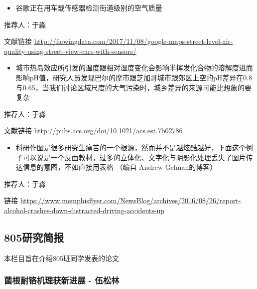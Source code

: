 \documentclass[]{book}
\providecommand{\tightlist}{%
  \setlength{\itemsep}{0pt}\setlength{\parskip}{0pt}}
\begin{document}
\begin{itemize}
\tightlist
\item
  谷歌正在用车载传感器检测街道级别的空气质量
\end{itemize}

推荐人：于淼

文献链接 \url{http://flowingdata.com/2017/11/08/google-maps-street-level-air-quality-using-street-view-cars-with-sensors/}

\begin{itemize}
\tightlist
\item
  城市热岛效应所引发的温度跟相对湿度变化会影响半挥发化合物的溶解度进而影响pH值，研究人员发现巴尔的摩市跟芝加哥城市跟郊区上空的pH差异在0.8与0.65，当我们讨论区域尺度的大气污染时，城乡差异的来源可能比想象的要复杂
\end{itemize}

推荐人：于淼

文献链接 \url{http://pubs.acs.org/doi/10.1021/acs.est.7b02786}

\begin{itemize}
\tightlist
\item
  科研作图是很多研究生痛苦的一个根源，然而并不是越炫酷越好，下面这个例子可以说是一个反面教材，过多的立体化、文字化与阴影化处理丢失了图片传达信息的意图，不如直接用表格 （编自 Andrew Gelman的博客）
\end{itemize}

推荐人：于淼

链接 \url{https://www.memphisflyer.com/NewsBlog/archives/2016/08/26/report-alcohol-crashes-down-distracted-driving-accidents-up}

\hypertarget{ux7814ux7a76ux7b80ux62a5}{%
\subsection*{805研究简报}\label{ux7814ux7a76ux7b80ux62a5}}

本栏目旨在介绍805班同学发表的论文

\hypertarget{ux83ccux6839ux8010ux94ecux673aux7406ux83b7ux65b0ux8fdbux5c55---ux4f0dux677eux6797}{%
\subsubsection*{菌根耐铬机理获新进展 - 伍松林}\label{ux83ccux6839ux8010ux94ecux673aux7406ux83b7ux65b0ux8fdbux5c55---ux4f0dux677eux6797}}
\end{document}
